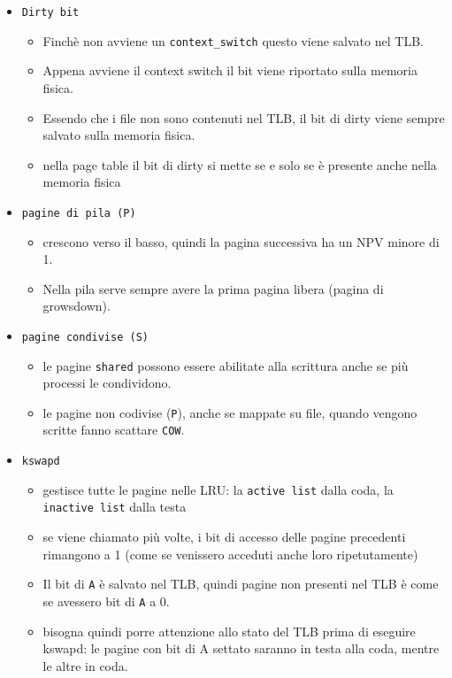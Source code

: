 \documentclass[12pt, a4paper]{report}
\begin{document}
\begin{itemize}
	\item \texttt{Dirty bit}
		\begin{itemize}
			\item Finchè non avviene un \texttt{context\_switch} questo viene
				salvato nel TLB.
			\item Appena avviene il context switch il bit viene riportato sulla
				memoria fisica.
			\item Essendo che i file non sono contenuti nel TLB, il bit di dirty
				viene sempre salvato sulla memoria fisica.
			\item nella page table il bit di dirty si mette se e solo se è
				presente anche nella memoria fisica
		\end{itemize}
	\item \texttt{pagine di pila (P)}
		\begin{itemize}
			\item crescono verso il basso, quindi la pagina successiva ha un NPV
				minore di 1.
			\item Nella pila serve sempre avere la prima pagina libera (pagina di
				growsdown).
		\end{itemize}
	\item \texttt{pagine condivise (S)}
		\begin{itemize}
			\item le pagine \texttt{shared} possono essere abilitate alla
				scrittura anche se più processi le condividono.
			\item le pagine non codivise (\texttt{P}), anche se mappate su file,
				quando vengono scritte fanno scattare \texttt{COW}.
		\end{itemize}
	\item \texttt{kswapd}
		\begin{itemize}
			\item gestisce tutte le pagine nelle LRU: la \texttt{active list}
				dalla coda, la \texttt{inactive list} dalla testa
			\item se viene chiamato più volte, i bit di accesso delle pagine
				precedenti rimangono a 1 (come se venissero acceduti anche loro
				ripetutamente)
			\item Il bit di \texttt{A} è salvato nel TLB, quindi pagine non
				presenti nel TLB è come se avessero bit di \texttt{A} a 0.
			\item bisogna quindi porre attenzione allo stato del TLB prima di
				eseguire kswapd: le pagine con bit di A settato saranno in testa
				alla coda, mentre le altre in coda.

\end{itemize}
\end{itemize}
\end{document}
